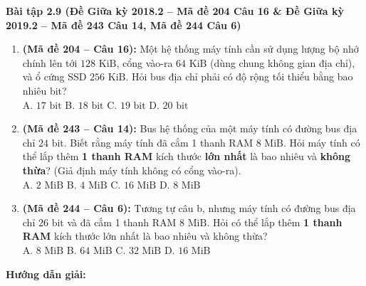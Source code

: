 \textbf{Bài tập 2.9 (Đề Giữa kỳ 2018.2 -- Mã đề 204 Câu 16 \& Đề Giữa kỳ 2019.2 -- Mã đề 243 Câu 14, Mã đề 244 Câu 6)}
\begin{enumerate}[label=\alph*)]
    \item \textbf{(Mã đề 204 -- Câu 16):} Một hệ thống máy tính cần sử dụng lượng bộ nhớ chính lên tới $128\text{ KiB}$, cổng vào-ra $64\text{ KiB}$ (dùng chung không gian địa chỉ), và ổ cứng SSD $256\text{ KiB}$. Hỏi bus địa chỉ phải có độ rộng tối thiểu bằng bao nhiêu bit?\\
    A. $17\text{ bit}$ \quad B. $18\text{ bit}$ \quad C. $19\text{ bit}$ \quad D. $20\text{ bit}$
    \item \textbf{(Mã đề 243 -- Câu 14):} Bus hệ thống của một máy tính có đường bus địa chỉ $24\text{ bit}$. Biết rằng máy tính đã cắm 1 thanh RAM $8\text{ MiB}$. Hỏi máy tính có thể lắp thêm \textbf{1 thanh RAM} kích thước \textbf{lớn nhất} là bao nhiêu và \textbf{không thừa}? (Giả định máy tính không có cổng vào-ra).\\
    A. $2\text{ MiB}$ \quad B. $4\text{ MiB}$ \quad C. $16\text{ MiB}$ \quad D. $8\text{ MiB}$
    \item \textbf{(Mã đề 244 -- Câu 6):} Tương tự câu b, nhưng máy tính có đường bus địa chỉ $26\text{ bit}$ và đã cắm 1 thanh RAM $8\text{ MiB}$. Hỏi có thể lắp thêm \textbf{1 thanh RAM} kích thước lớn nhất là bao nhiêu và không thừa?\\
    A. $8\text{ MiB}$ \quad B. $64\text{ MiB}$ \quad C. $32\text{ MiB}$ \quad D. $16\text{ MiB}$
\end{enumerate}
\textbf{Hướng dẫn giải:}
